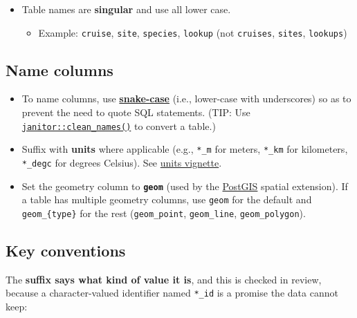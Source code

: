 \documentclass[
  letterpaper,
  DIV=11,
  numbers=noendperiod]{scrreprt}
\providecommand{\tightlist}{%
  \setlength{\itemsep}{0pt}\setlength{\parskip}{0pt}}
\begin{document}
\begin{itemize}
\tightlist
\item
  Table names are \textbf{singular} and use all lower case.

  \begin{itemize}
  \tightlist
  \item
    Example: \texttt{cruise}, \texttt{site}, \texttt{species},
    \texttt{lookup} (not \texttt{cruises}, \texttt{sites},
    \texttt{lookups})
  \end{itemize}
\end{itemize}

\subsection{Name columns}\label{name-columns}

\begin{itemize}
\item
  To name columns, use
  \href{https://cran.r-project.org/web/packages/snakecase/vignettes/introducing-the-snakecase-package.html}{\textbf{snake-case}}
  (i.e., lower-case with underscores) so as to prevent the need to quote
  SQL statements. (TIP: Use
  \href{https://sfirke.github.io/janitor/reference/clean_names.html}{\texttt{janitor::clean\_names()}}
  to convert a table.)
\item
  Suffix with \textbf{units} where applicable (e.g., \texttt{*\_m} for
  meters, \texttt{*\_km} for kilometers, \texttt{*\_degc} for degrees
  Celsius). See
  \href{https://cran.r-project.org/web/packages/units/vignettes/measurement_units_in_R.html}{units
  vignette}.
\item
  Set the geometry column to \textbf{\texttt{geom}} (used by the
  \href{https://postgis.net}{PostGIS} spatial extension). If a table has
  multiple geometry columns, use \texttt{geom} for the default and
  \texttt{geom\_\{type\}} for the rest (\texttt{geom\_point},
  \texttt{geom\_line}, \texttt{geom\_polygon}).
\end{itemize}

\subsection{Key conventions}\label{key-conventions}

The \textbf{suffix says what kind of value it is}, and this is checked
in review, because a character-valued identifier named \texttt{*\_id} is
a promise the data cannot keep:
\end{document}
